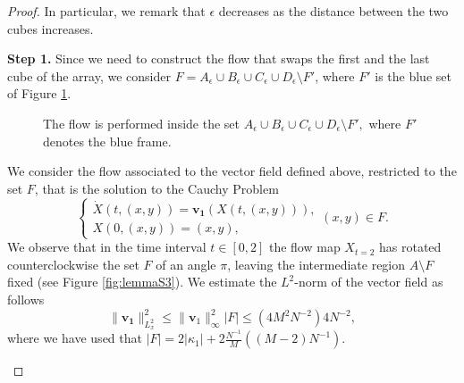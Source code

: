 \documentclass[10pt,a4paper]{amsart}
\begin{document}
\begin{proof}
   In particular, we remark that $\epsilon$ decreases as the distance between the two cubes increases. 

   \textbf{Step 1.} Since we need to construct the flow that swaps the first and the last cube of the array, we consider $F=A_\epsilon\cup B_\epsilon\cup C_\epsilon\cup D_\epsilon\setminus F'$, where $F'$ is the blue set of Figure \ref{fig:lemmaS2}.
   \begin{figure}
       \centering
       
       \caption{The flow is performed inside the set $A_\epsilon\cup B_\epsilon\cup C_\epsilon\cup D_\epsilon \setminus F',$ where $F'$ denotes the blue frame.}
       \label{fig:lemmaS2}
   \end{figure}
    We consider the flow associated to the vector field defined above, restricted to the set $F$, that is the solution to the Cauchy Problem
    \begin{equation*}
        \begin{cases}
            \dot X(t,(x,y))= \mathbf{ v_1}(X(t, (x,y))), \\
            X(0,(x,y))=(x,y),
        \end{cases}
        (x,y)\in F.
    \end{equation*}
   We observe that in the time interval $t\in[0,2]$ the flow map $X_{t=2}$ has rotated counterclockwise the set $F$ of an angle $\pi$, leaving the intermediate region $A\setminus F$ fixed (see Figure \ref{fig:lemmaS3}). We estimate the $L^2$-norm of the vector field as follows
   \begin{equation*}
       \|\mathbf {v_1}\|^2_{L^2_x}\leq \|\mathbf v_1\|_\infty^2|F|\leq (4M^{2}N^{-2})4N^{-2},
   \end{equation*}
   where we have used that $|F|=2|\kappa_1|+2\frac{N^{-1}}{M} ((M-2)N^{-1}).$
   \begin{figure}
       \centering
       

\end{figure}
\end{proof}
\end{document}
